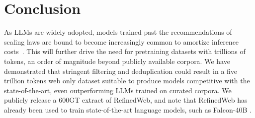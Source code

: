 \section{Conclusion}
As LLMs are widely adopted, models trained past the recommendations of scaling laws are bound to become increasingly common to amortize inference costs~\cite{touvron2023llama}. This will further drive the need for pretraining datasets with trillions of tokens, an order of magnitude beyond publicly available corpora. We have demonstrated that stringent filtering and deduplication could result in a five trillion tokens web only dataset suitable to produce models competitive with the state-of-the-art, even outperforming LLMs trained on curated corpora. We publicly release a 600GT extract of RefinedWeb, and note that RefinedWeb has already been used to train state-of-the-art language models, such as Falcon-40B \cite{falcon40b}.


